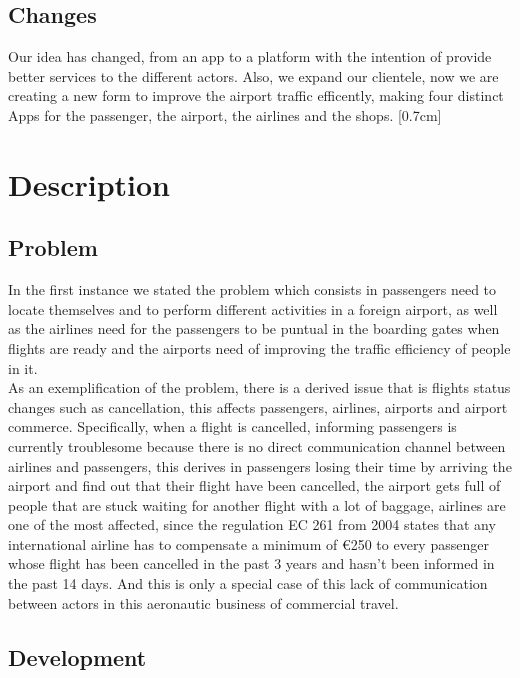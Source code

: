 \documentclass[]{article}
\begin{document}
\subsection{Changes}
Our idea has changed, from an app to a platform with the intention of provide better services to the different actors. Also, we expand our clientele, now we are creating a new form to improve the airport traffic efficently, making four distinct Apps for the passenger, the airport, the airlines and the shops.
[0.7cm]
\\
\section{Description}

\subsection{Problem}

In the first instance we stated the problem which consists in passengers need to locate themselves and to perform different activities in a foreign airport, as well as the airlines need for the passengers to be puntual in the boarding gates when flights are ready and the airports need of improving the traffic efficiency of people in it.\\

As an exemplification of the problem, there is a derived issue that is flights status changes such as cancellation, this affects passengers, airlines, airports and airport commerce. Specifically, when a flight is cancelled, informing passengers is currently troublesome because there is no direct communication channel between airlines and passengers, this derives in passengers losing their time by arriving the airport and find out that their flight have been cancelled, the airport gets full of people that are stuck waiting for another flight with a lot of baggage, airlines are one of the most affected, since the regulation EC 261 from 2004 states that any international airline has to compensate a minimum of €250 to every passenger whose flight has been cancelled in the past 3 years and hasn't been informed in the past 14 days. And this is only a special case of this lack of communication between actors in this aeronautic business of commercial travel.\\

\subsection{Development}
\end{document}
